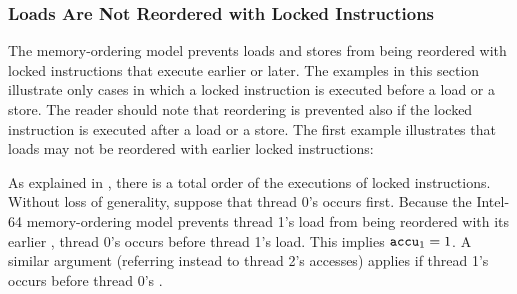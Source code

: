 \newpage

\subsubsection*{Loads Are Not Reordered with Locked Instructions}

The memory-ordering model prevents loads and stores from being reordered with locked instructions that execute earlier or later.
The examples in this section illustrate only cases in which a locked instruction is executed before a load or a store.
The reader should note that reordering is prevented also if the locked instruction is executed after a load or a store.
\bigbreak
\noindent
The first example illustrates that loads may not be reordered with earlier locked instructions:

\begin{table}[!hbt]
\noindent{}
\caption[Loads Are not Reordered with Locks]{Loads Are not Reordered with Locks \cite[Example 8-9]{ref:Intel}}
\label{tbl:litmus:intel:9}
\end{table}

\noindent
As explained in \cite[Section 8.2.3.8]{ref:Intel}, there is a total order of the executions of locked instructions.
Without loss of generality, suppose that thread 0’s  occurs first.
\bigbreak
\noindent
Because the Intel-64 memory-ordering model prevents thread 1’s load from being reordered with its earlier , thread 0’s  occurs before thread 1’s load.
This implies $\texttt{accu}_1 = 1$.
\bigbreak
\noindent
A similar argument (referring instead to thread 2’s accesses) applies if thread 1’s  occurs before thread 0’s .

